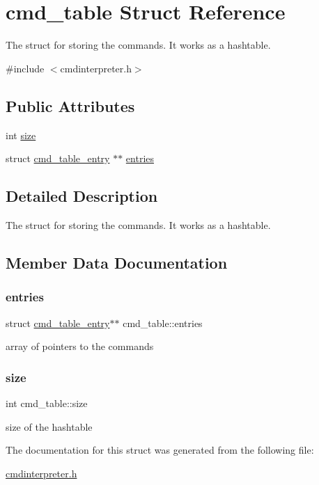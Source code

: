 \hypertarget{structcmd__table}{}\section{cmd\+\_\+table Struct Reference}
\label{structcmd__table}


The struct for storing the commands. It works as a hashtable.  




{\ttfamily \#include $<$cmdinterpreter.\+h$>$}

\subsection*{Public Attributes}
\begin{DoxyCompactItemize}
\item 
int \mbox{\hyperlink{structcmd__table_a354247fd8c3c8f9222002ad58597185e}{size}}
\item 
struct \mbox{\hyperlink{structcmd__table__entry}{cmd\+\_\+table\+\_\+entry}} $\ast$$\ast$ \mbox{\hyperlink{structcmd__table_a69b5f9a41132d73087d7332a7f3adc44}{entries}}
\end{DoxyCompactItemize}


\subsection{Detailed Description}
The struct for storing the commands. It works as a hashtable. 

\subsection{Member Data Documentation}
\mbox{\label{structcmd__table_a69b5f9a41132d73087d7332a7f3adc44}} 
\subsubsection{\texorpdfstring{entries}{entries}}
{\footnotesize\ttfamily struct \mbox{\hyperlink{structcmd__table__entry}{cmd\+\_\+table\+\_\+entry}}$\ast$$\ast$ cmd\+\_\+table\+::entries}

array of pointers to the commands \mbox{\label{structcmd__table_a354247fd8c3c8f9222002ad58597185e}} 
\subsubsection{\texorpdfstring{size}{size}}
{\footnotesize\ttfamily int cmd\+\_\+table\+::size}

size of the hashtable 

The documentation for this struct was generated from the following file\+:\begin{DoxyCompactItemize}
\item 
\mbox{\hyperlink{cmdinterpreter_8h}{cmdinterpreter.\+h}}\end{DoxyCompactItemize}

